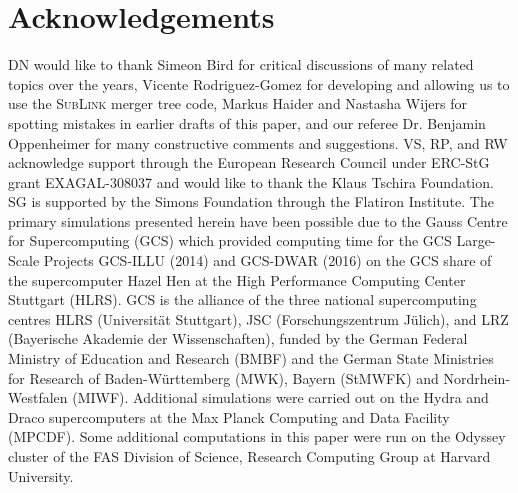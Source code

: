 \documentclass[useAMS,usenatbib]{mnras}
\begin{document}
\section*{Acknowledgements}
DN would like to thank Simeon Bird for critical discussions of many related topics over the years, Vicente Rodriguez-Gomez for developing and allowing us to use the \textsc{SubLink} merger tree code, Markus Haider and Nastasha Wijers for spotting mistakes in earlier drafts of this paper, and our referee Dr. Benjamin Oppenheimer for many constructive comments and suggestions.
VS, RP, and RW acknowledge support through the European Research Council under ERC-StG grant EXAGAL-308037 and would like to thank the Klaus Tschira Foundation. 
SG is supported by the Simons Foundation through the Flatiron Institute.
The primary simulations presented herein have been possible due to the Gauss Centre for Supercomputing (GCS) which provided computing time for the GCS Large-Scale Projects GCS-ILLU (2014) and GCS-DWAR (2016) on the GCS share of the supercomputer Hazel Hen at the High Performance Computing Center Stuttgart (HLRS). GCS is the alliance of the three national supercomputing centres HLRS (Universit{\"a}t Stuttgart), JSC (Forschungszentrum J{\"u}lich), and LRZ (Bayerische Akademie der Wissenschaften), funded by the German Federal Ministry of Education and Research (BMBF) and the German State Ministries for Research of Baden-W{\"u}rttemberg (MWK), Bayern (StMWFK) and Nordrhein-Westfalen (MIWF). 
Additional simulations were carried out on the Hydra and Draco supercomputers at the Max Planck Computing and Data Facility (MPCDF). Some additional computations in this paper were run on the Odyssey cluster of the FAS Division of Science, Research Computing Group at Harvard University.



\end{document}

